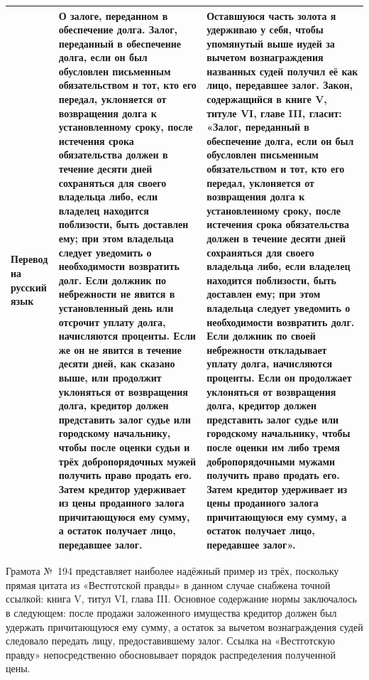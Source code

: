 \begin{center}
\begin{longtable}{|p{}|p{}|p{}|}
\textbf{Перевод на русский язык} & \textbf{О залоге, переданном в обеспечение долга.} Залог, переданный в обеспечение долга, если он был обусловлен письменным обязательством и тот, кто его передал, уклоняется от возвращения долга к установленному сроку, после истечения срока обязательства должен в течение десяти дней сохраняться для своего владельца либо, если владелец находится поблизости, быть доставлен ему; при этом владельца следует уведомить о необходимости возвратить долг. Если должник по небрежности не явится в установленный день или отсрочит уплату долга, начисляются проценты. Если же он не явится в течение десяти дней, как сказано выше, или продолжит уклоняться от возвращения долга, кредитор должен представить залог судье или городскому начальнику, чтобы после оценки судьи и трёх добропорядочных мужей получить право продать его. Затем кредитор удерживает из цены проданного залога причитающуюся ему сумму, а остаток получает лицо, передавшее залог. & Оставшуюся часть золота я удерживаю у себя, чтобы упомянутый выше иудей за вычетом вознаграждения названных судей получил её как лицо, передавшее залог. Закон, содержащийся в книге V, титуле VI, главе III, гласит: «Залог, переданный в обеспечение долга, если он был обусловлен письменным обязательством и тот, кто его передал, уклоняется от возвращения долга к установленному сроку, после истечения срока обязательства должен в течение десяти дней сохраняться для своего владельца либо, если владелец находится поблизости, быть доставлен ему; при этом владельца следует уведомить о необходимости возвратить долг. Если должник по своей небрежности откладывает уплату долга, начисляются проценты. Если он продолжает уклоняться от возвращения долга, кредитор должен представить залог судье или городскому начальнику, чтобы после оценки им либо тремя добропорядочными мужами получить право продать его. Затем кредитор удерживает из цены проданного залога причитающуюся ему сумму, а остаток получает лицо, передавшее залог». \\ \hline
\end{longtable}
\end{center}

Грамота №~194 представляет наиболее надёжный пример из трёх, поскольку прямая цитата из «Вестготской правды» в данном случае снабжена точной ссылкой: книга V, титул VI, глава III. Основное содержание нормы заключалось в следующем: после продажи заложенного имущества кредитор должен был удержать причитающуюся ему сумму, а остаток за вычетом вознаграждения судей следовало передать лицу, предоставившему залог. Ссылка на «Вестготскую правду» непосредственно обосновывает порядок распределения полученной цены.

